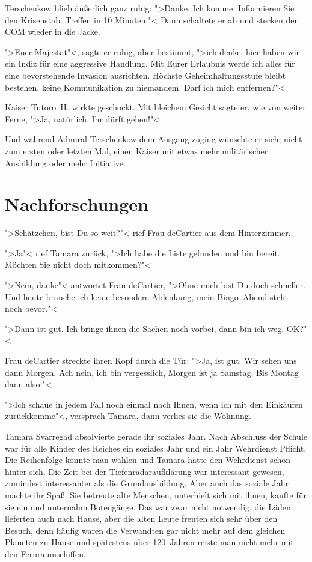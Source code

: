 Terschenkow blieb äußerlich ganz ruhig: ">Danke. Ich komme. Informieren Sie den Krisenstab. Treffen in 10 Minuten."< Dann schaltete er ab und stecken den COM wieder in die Jacke.

">Euer Majestät"<, sagte er ruhig, aber bestimmt, ">ich denke, hier haben wir ein Indiz für eine aggressive Handlung. Mit Eurer Erlaubnis werde ich alles für eine bevorstehende Invasion ausrichten. Höchste Geheimhaltungsstufe bleibt bestehen, keine Kommunikation zu niemandem. Darf ich mich entfernen?"<

Kaiser Tutoro~II. wirkte geschockt. Mit bleichem Gesicht sagte er, wie von weiter Ferne, ">Ja, natürlich. Ihr dürft gehen!"<

Und während Admiral Terschenkow dem Ausgang zuging wünschte er sich, nicht zum ersten oder letzten Mal, einen Kaiser mit etwas mehr militärischer Ausbildung oder mehr Initiative.

\chapter{Nachforschungen}

">Schätzchen, bist Du so weit?"< rief Frau deCartier aus dem Hinterzimmer.

">Ja"< rief Tamara zurück, ">Ich habe die Liste gefunden und bin bereit. Möchten Sie nicht doch mitkommen?"<

">Nein, danke"< antwortet Frau deCartier, ">Ohne mich bist Du doch schneller. Und heute brauche ich keine besondere Ablenkung, mein Bingo--Abend steht noch bevor."<

">Dann ist gut. Ich bringe ihnen die Sachen noch vorbei, dann bin ich weg. OK?"<

Frau deCartier streckte ihren Kopf durch die Tür: ">Ja, ist gut. Wir sehen uns dann Morgen. Ach nein, ich bin vergesslich, Morgen ist ja Samstag. Bis Montag dann also."<

">Ich schaue in jedem Fall noch einmal nach Ihnen, wenn ich mit den Einkäufen zurückkomme"<, versprach Tamara, dann verlies sie die Wohnung.

Tamara Svårregad absolvierte gerade ihr soziales Jahr. Nach Abschluss der Schule war für alle Kinder des Reiches ein soziales Jahr und ein Jahr Wehrdienst Pflicht. Die Reihenfolge konnte man wählen und Tamara hatte den Wehrdienst schon hinter sich. Die Zeit bei der Tiefenradaraufklärung war interessant gewesen, zumindest interessanter als die Grundausbildung. Aber auch das soziale Jahr machte ihr Spaß. Sie betreute alte Menschen, unterhielt sich mit ihnen, kaufte für sie ein und unternahm Botengänge. Das war zwar nicht notwendig, die Läden lieferten auch nach Hause, aber die alten Leute freuten sich sehr über den Besuch, denn häufig waren die Verwandten gar nicht mehr auf dem gleichen Planeten zu Hause und spätestens über 120~Jahren reiste man nicht mehr mit den Fernraumschiffen.

